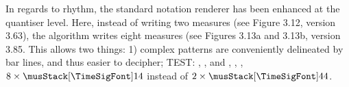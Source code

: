 \documentclass{article}
\begin{document}
In regards to rhythm, the standard notation renderer has been enhanced at the
quantiser level.  
Here, instead of writing two  measures (see Figure 3.12,
version 3.63), the algorithm writes eight  measures (see
Figures 3.13a and 3.13b, version 3.85. 
This allows two things: 1) complex patterns are conveniently delineated by bar
lines, and thus easier to decipher; TEST: \musFlat{}, \musSharp{}, and
\musNatural{}, \musThirtySecond{}, \meterCThreeTwo{}, $8\times\TimeSig{1}{4}$
instead of $2\times\TimeSig{4}{4}$.
\end{document}

